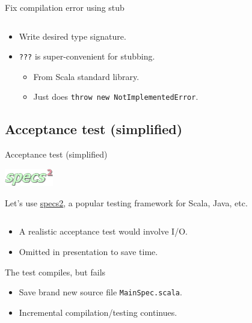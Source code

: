 \begin{frame}[fragile]{Fix compilation error using stub}
  \inputminted{scala}{Main2.scala}

  \begin{itemize}
  \item Write desired type signature.
  \item \texttt{???} is super-convenient for stubbing.
    \begin{itemize}
    \item From Scala standard library.
    \item Just does \texttt{throw new NotImplementedError}.
    \end{itemize}
  \end{itemize}
\end{frame}

\subsection{Acceptance test (simplified)}

\begin{frame}[fragile]{Acceptance test (simplified)}
  \begin{center}
    \includegraphics[height=0.75cm]{specs2.png}
  \end{center}

  Let's use \href{http://specs2.org/}{specs2}, a popular testing framework for Scala, Java, etc.

  \inputminted{scala}{MainSpec1.scala}

  \begin{itemize}
  \item A realistic acceptance test would involve I/O.
  \item Omitted in presentation to save time.
  \end{itemize}
\end{frame}

\begin{frame}[fragile]{The test compiles, but fails}
  
  \begin{itemize}
  \item Save brand new source file \texttt{MainSpec.scala}.
  \item Incremental compilation/testing continues.
  \end{itemize}

  \inputminted{console}{testQuick2.console}
\end{frame}

